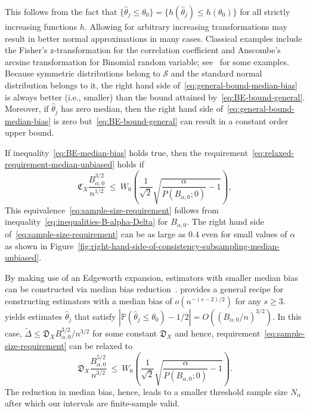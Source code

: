 \documentclass{article}
\numberwithin{myalgctr}{section}
\begin{document}
This follows from the fact that $\{\widehat{\theta}_j \le \theta_0\} = \{h(\widehat{\theta}_j) \le h(\theta_0)\}$ for all strictly increasing functions $h$. Allowing for arbitrary increasing transformations may result in better normal approximations in many cases. Classical examples include the Fisher's z-transformation for the correlation coefficient and Anscombe's arcsine transformation for Binomial random variable; see~\cite{borges1970approximation,gebhardt1969some,borges1971derivation,efron1982transformation} for some examples. Because symmetric distributions belong to $\mathcal{S}$ and the standard normal distribution belongs to it, the right hand side of~\eqref{eq:general-bound-median-bias} is always better (i.e., smaller) than the bound attained by~\eqref{eq:BE-bound-general}. Moreover, if $\widehat{\theta}_j$ has zero median, then the right hand side of~\eqref{eq:general-bound-median-bias} is zero but~\eqref{eq:BE-bound-general} can result in a constant order upper bound.

If inequality~\eqref{eq:BE-median-bias} holds true, then {\color{black}the requirement~\eqref{eq:relaxed-requirement-median-unbiased} holds if
\begin{equation}\label{eq:sample-size-requirement}
\mathfrak{C}_X\frac{B_{\alpha,0}^{3/2}}{n^{1/2}} ~\le~ W_0\left(\frac{1}{\sqrt{2}}\sqrt{\frac{\alpha}{P(B_{\alpha,0}; 0)} - 1}\right),
\end{equation}}
This equivalence~\eqref{eq:sample-size-requirement} follows from inequality~\eqref{eq:inequalities-B-alpha-Delta} for $B_{\alpha,0}$. 
{\color{black}The right hand side of~\eqref{eq:sample-size-requirement}} can be as large as $0.4$ even for small values of $\alpha$ as shown in Figure~\ref{fig:right-hand-side-of-consistency-subsampling-median-unbiased}.

By making use of an Edgeworth expansion, estimators with smaller median bias can be constructed via median bias reduction~\citep{pfanzagl1973asymptotic,kenne2017median}. \citet[Section 6]{pfanzagl1973asymptotic} provides a general recipe for constructing estimators with a median bias of $o(n^{-(s-2)/2})$ for any $s \ge 3$. \citet[Eq. (3)]{kenne2017median} yields estimates $\widehat{\theta}_j$ that satisfy $|\mathbb{P}(\widehat{\theta}_j \le \theta_0) - 1/2| = O((B_{\alpha,0}/n)^{3/2})$. In this case, $\widetilde{\Delta} \le \mathfrak{D}_XB_{\alpha,0}^{3/2}/n^{3/2}$ for some constant $\mathfrak{D}_X$ and hence, requirement~\eqref{eq:sample-size-requirement} can be relaxed to
\[
\mathfrak{D}_X\frac{B_{\alpha,0}^{5/2}}{n^{3/2}} ~\le~ W_0\left(\frac{1}{\sqrt{2}}\sqrt{\frac{\alpha}{P(B_{\alpha,0}; 0)} - 1}\right).
\]
The reduction in median bias, hence, leads to a smaller threshold sample size $N_{\alpha}$ after which our intervals are finite-sample valid.
\end{document}
